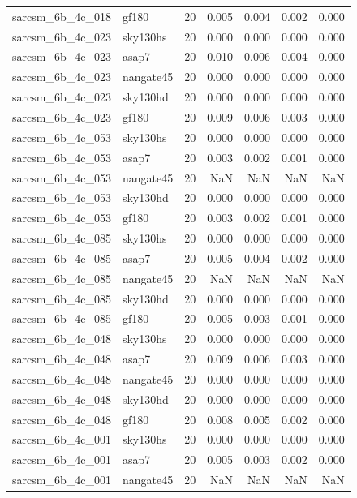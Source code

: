 \begin{tabular}{llrrrrr}
sarcsm\_6b\_4c\_018 & gf180 & 20 & 0.005 & 0.004 & 0.002 & 0.000 \\
sarcsm\_6b\_4c\_023 & sky130hs & 20 & 0.000 & 0.000 & 0.000 & 0.000 \\
sarcsm\_6b\_4c\_023 & asap7 & 20 & 0.010 & 0.006 & 0.004 & 0.000 \\
sarcsm\_6b\_4c\_023 & nangate45 & 20 & 0.000 & 0.000 & 0.000 & 0.000 \\
sarcsm\_6b\_4c\_023 & sky130hd & 20 & 0.000 & 0.000 & 0.000 & 0.000 \\
sarcsm\_6b\_4c\_023 & gf180 & 20 & 0.009 & 0.006 & 0.003 & 0.000 \\
sarcsm\_6b\_4c\_053 & sky130hs & 20 & 0.000 & 0.000 & 0.000 & 0.000 \\
sarcsm\_6b\_4c\_053 & asap7 & 20 & 0.003 & 0.002 & 0.001 & 0.000 \\
sarcsm\_6b\_4c\_053 & nangate45 & 20 & NaN & NaN & NaN & NaN \\
sarcsm\_6b\_4c\_053 & sky130hd & 20 & 0.000 & 0.000 & 0.000 & 0.000 \\
sarcsm\_6b\_4c\_053 & gf180 & 20 & 0.003 & 0.002 & 0.001 & 0.000 \\
sarcsm\_6b\_4c\_085 & sky130hs & 20 & 0.000 & 0.000 & 0.000 & 0.000 \\
sarcsm\_6b\_4c\_085 & asap7 & 20 & 0.005 & 0.004 & 0.002 & 0.000 \\
sarcsm\_6b\_4c\_085 & nangate45 & 20 & NaN & NaN & NaN & NaN \\
sarcsm\_6b\_4c\_085 & sky130hd & 20 & 0.000 & 0.000 & 0.000 & 0.000 \\
sarcsm\_6b\_4c\_085 & gf180 & 20 & 0.005 & 0.003 & 0.001 & 0.000 \\
sarcsm\_6b\_4c\_048 & sky130hs & 20 & 0.000 & 0.000 & 0.000 & 0.000 \\
sarcsm\_6b\_4c\_048 & asap7 & 20 & 0.009 & 0.006 & 0.003 & 0.000 \\
sarcsm\_6b\_4c\_048 & nangate45 & 20 & 0.000 & 0.000 & 0.000 & 0.000 \\
sarcsm\_6b\_4c\_048 & sky130hd & 20 & 0.000 & 0.000 & 0.000 & 0.000 \\
sarcsm\_6b\_4c\_048 & gf180 & 20 & 0.008 & 0.005 & 0.002 & 0.000 \\
sarcsm\_6b\_4c\_001 & sky130hs & 20 & 0.000 & 0.000 & 0.000 & 0.000 \\
sarcsm\_6b\_4c\_001 & asap7 & 20 & 0.005 & 0.003 & 0.002 & 0.000 \\
sarcsm\_6b\_4c\_001 & nangate45 & 20 & NaN & NaN & NaN & NaN \\

\end{tabular}
